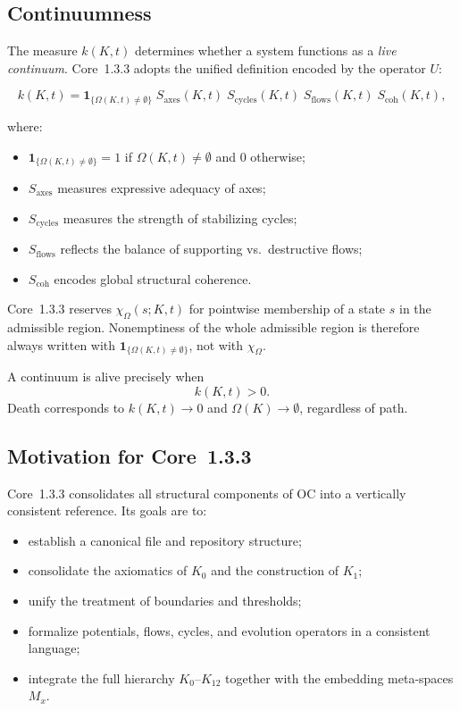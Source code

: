 \subsection{Continuumness}

The measure \(k(K,t)\) determines whether a system functions as a \emph{live continuum}.
Core~1.3.3 adopts the unified definition encoded by the operator \(U\):

\[
k(K,t) =
\mathbf{1}_{\{\Omega(K,t)\neq\emptyset\}}\;
S_{\mathrm{axes}}(K,t)\;
S_{\mathrm{cycles}}(K,t)\;
S_{\mathrm{flows}}(K,t)\;
S_{\mathrm{coh}}(K,t),
\]

where:

\begin{itemize}
    \item \(\mathbf{1}_{\{\Omega(K,t)\neq\emptyset\}}=1\) if
          \(\Omega(K,t)\neq\emptyset\) and \(0\) otherwise;
    \item \(S_{\mathrm{axes}}\) measures expressive adequacy of axes;
    \item \(S_{\mathrm{cycles}}\) measures the strength of stabilizing cycles;
    \item \(S_{\mathrm{flows}}\) reflects the balance of supporting vs.\ destructive flows;
    \item \(S_{\mathrm{coh}}\) encodes global structural coherence.
\end{itemize}

Core~1.3.3 reserves \(\chi_{\Omega}(s;K,t)\) for pointwise membership of a
state \(s\) in the admissible region. Nonemptiness of the whole admissible
region is therefore always written with
\(\mathbf{1}_{\{\Omega(K,t)\neq\emptyset\}}\), not with \(\chi_{\Omega}\).

A continuum is alive precisely when
\[
k(K,t) > 0.
\]
Death corresponds to \(k(K,t)\to 0\) and \(\Omega(K)\to\emptyset\), regardless of path.

\subsection{Motivation for Core~1.3.3}

Core~1.3.3 consolidates all structural components of OC into a vertically
consistent reference.
Its goals are to:

\begin{itemize}
    \item establish a canonical file and repository structure;
    \item consolidate the axiomatics of \(K_0\) and the construction of \(K_1\);
    \item unify the treatment of boundaries and thresholds;
    \item formalize potentials, flows, cycles, and evolution operators in a consistent language;
    \item integrate the full hierarchy \(K_0\)–\(K_{12}\) together with the embedding meta-spaces \(M_x\).
\end{itemize}

